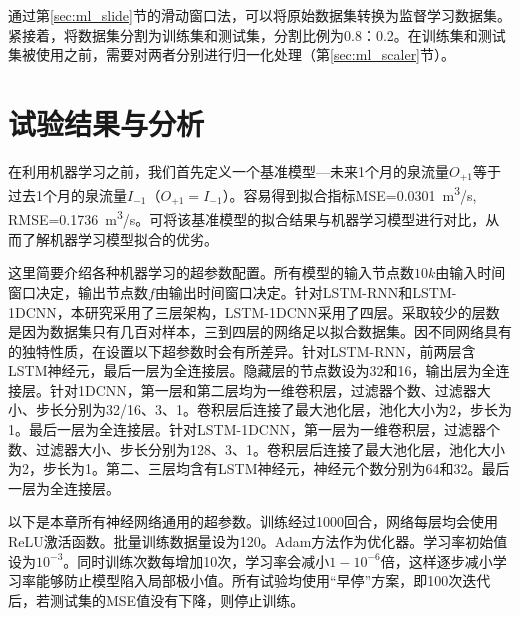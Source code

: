 通过第\ref{sec:ml_slide}节的滑动窗口法，可以将原始数据集转换为监督学习数据集。紧接着，将数据集分割为训练集和测试集，分割比例为0.8：0.2。在训练集和测试集被使用之前，需要对两者分别进行归一化处理（第\ref{sec:ml_scaler}节）。

\section{试验结果与分析}\label{sec:spr_result}

在利用机器学习之前，我们首先定义一个基准模型---未来1个月的泉流量$O_{+1}$等于过去1个月的泉流量$I_{-1}$（$O_{+1}=I_{-1}$）。容易得到拟合指标MSE=\SI{0.0301}{m^{3}/s}, RMSE=\SI{0.1736}{m^{3}/s}。可将该基准模型的拟合结果与机器学习模型进行对比，从而了解机器学习模型拟合的优劣。

这里简要介绍各种机器学习的超参数配置。所有模型的输入节点数$10k$由输入时间窗口决定，输出节点数$f$由输出时间窗口决定。针对LSTM-RNN和LSTM-1DCNN，本研究采用了三层架构，LSTM-1DCNN采用了四层。采取较少的层数是因为数据集只有几百对样本，三到四层的网络足以拟合数据集。因不同网络具有的独特性质，在设置以下超参数时会有所差异。针对LSTM-RNN，前两层含LSTM神经元，最后一层为全连接层。隐藏层的节点数设为32和16，输出层为全连接层。针对1DCNN，第一层和第二层均为一维卷积层，过滤器个数、过滤器大小、步长分别为32/16、3、1。卷积层后连接了最大池化层，池化大小为2，步长为1。最后一层为全连接层。针对LSTM-1DCNN，第一层为一维卷积层，过滤器个数、过滤器大小、步长分别为128、3、1。卷积层后连接了最大池化层，池化大小为2，步长为1。第二、三层均含有LSTM神经元，神经元个数分别为64和32。最后一层为全连接层。 

以下是本章所有神经网络通用的超参数。训练经过1000回合，网络每层均会使用ReLU激活函数。批量训练数据量设为120。Adam方法作为优化器。学习率初始值设为$10^{-3}$。同时训练次数每增加10次，学习率会减小$1-10^{-6}$倍，这样逐步减小学习率能够防止模型陷入局部极小值。所有试验均使用“早停”方案，即100次迭代后，若测试集的MSE值没有下降，则停止训练。

